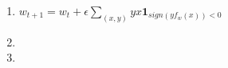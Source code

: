 \documentclass[a4paper,10pt]{article}
\title{}
\author{Arnaud Paran}
\begin{document}
\makeatletter
\newcommand*{\bdiv}{%
	\nonscript\mskip-\medmuskip\mkern5mu%
	\mathbin{\operator@font div}\penalty900\mkern5mu%
	\nonscript\mskip-\medmuskip
}
\makeatother


\maketitle

\begin{enumerate}
		\item $w_{t+1} = w_t + \epsilon \sum_{(x,y)} yx\mathbf{1}_{sign(yf_w(x))<0} $
		\item
		\item
\end{enumerate}
\end{document}
